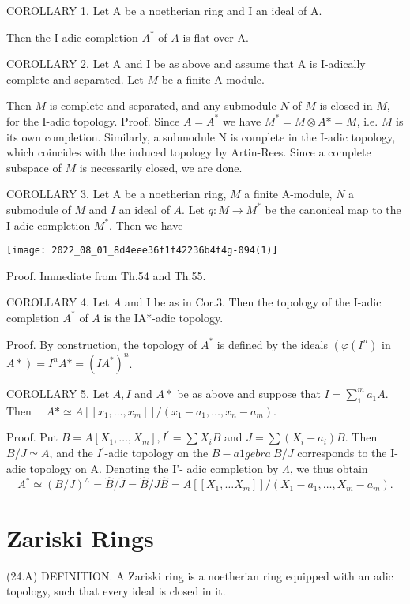 COROLLARY 1. Let A be a noetherian ring and I an ideal of A.

Then the I-adic completion $A^{*}$ of $A$ is flat over A.

COROLLARY 2. Let A and I be as above and assume that A is I-adically complete and separated. Let $M$ be a finite A-module.

Then $M$ is complete and separated, and any submodule $N$ of $M$ is closed in $M$, for the I-adic topology. Proof. Since $A=A^{*}$ we have $M^{*}=M \otimes A *=M$, i.e. $M$ is its own completion. Similarly, a submodule $\mathrm{N}$ is complete in the I-adic topology, which coincides with the induced topology by Artin-Rees. Since a complete subspace of $M$ is necessarily closed, we are done.

COROLLARY 3. Let A be a noetherian ring, $M$ a finite A-module, $N$ a submodule of $M$ and $I$ an ideal of $A$. Let $q: M \rightarrow M^{*}$ be the canonical map to the I-adic completion $M^{*}$. Then we have

\texttt{[image: 2022\_08\_01\_8d4eee36f1f42236b4f4g-094(1)]}

Proof. Immediate from Th.54 and Th.55.

COROLLARY 4. Let $A$ and I be as in Cor.3. Then the topology of the I-adic completion $A^{*}$ of $A$ is the IA*-adic topology.

Proof. By construction, the topology of $A^{*}$ is defined by the ideals $\left(\varphi\left(I^{n}\right)\right.$ in $\left.A *\right)=I^{n} A *=\left(I A^{*}\right)^{n}$.

COROLLARY 5. Let $A, I$ and $A *$ be as above and suppose that $I=\sum_{1}^{m} a_{1} A . \quad$ Then $\quad A * \simeq A\left[\left[x_{1}, \ldots, x_{m}\right]\right] /\left(x_{1}-a_{1}, \ldots, x_{n}-a_{m}\right)$.

Proof. Put $B=A\left[X_{1}, \ldots, X_{m}\right], I^{\prime}=\sum X_{i} B$ and $J=\sum\left(X_{i}-a_{i}\right) B$. Then $B / J \simeq A$, and the $I^{\prime}$-adic topology on the $B-a 1 g e b r a ~ B / J$ corresponds to the I-adic topology on A. Denoting the I'- adic completion by $\Lambda$, we thus obtain
$$
A^{*} \simeq(B / J)^{\wedge}=\hat{B} / \hat{J}=\hat{B} / J \hat{B}=A\left[\left[X_{1}, \ldots X_{m}\right]\right] /\left(X_{1}-a_{1}, \ldots, X_{m}-a_{m}\right) .
$$

\section{Zariski Rings}
(24.A) DEFINITION. A Zariski ring is a noetherian ring equipped with an adic topology, such that every ideal is closed in it.

